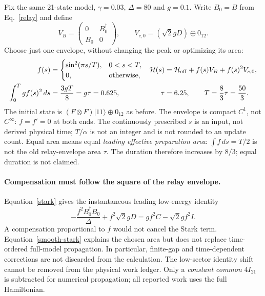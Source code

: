 \documentclass[11pt,a4paper]{article}
\newcommand{\ket}[1]{|#1\rangle}
\begin{document}
Fix the same 21-state model, $\gamma=0.03$, $\Delta=80$ and
$g=0.1$. Write $B_0=B$ from Eq.~\eqref{relay} and define
\begin{equation}
 V_B=\begin{pmatrix}0&B_0^\dagger\\B_0&0\end{pmatrix},\qquad
 V_{c,0}=(\sqrt2gD)\oplus0_{12}.
\end{equation}
Choose just one envelope, without changing the peak or optimizing its area:
\begin{align}
 f(s)&=\begin{cases}\sin^2(\pi s/T),&0<s<T,\\0,&\text{otherwise},\end{cases}
 &\mathcal H(s)&=\mathcal H_{\rm off}+f(s)V_B+f(s)^2V_{c,0},\label{smooth-H}\\
 \int_0^T gf(s)^2\,ds&=\frac{3gT}{8}=g\tau=0.625,
 &\tau&=6.25,\qquad T=\frac83\tau=\frac{50}{3}.\label{smooth-area}
\end{align}
The initial state is $(F\otimes F)\ket{11}\oplus0_{12}$ as before.
The envelope is compact $C^1$, not $C^\infty$: $f=f'=0$ at both ends.
The continuously prescribed $s$ is an input, not derived physical time;
$T/\alpha$ is not an integer and is not rounded to an update count.
Equal area means equal \emph{leading effective preparation area}:
$\int f\,ds=T/2$ is not the old relay-envelope area $\tau$.
The duration therefore increases by $8/3$; equal duration is not claimed.

\paragraph{Compensation must follow the square of the relay envelope.}
Equation~\eqref{stark} gives the instantaneous leading low-energy identity
\begin{equation}
 -\frac{f^2 B_0^\dagger B_0}{\Delta}+f^2\sqrt2gD
 =gf^2C-\sqrt2gf^2 I.\label{smooth-stark}
\end{equation}
A compensation proportional to $f$ would not cancel the Stark term.
Equation~\eqref{smooth-stark} explains the chosen area but does not replace
time-ordered full-model propagation. In particular, finite-gap and
time-dependent corrections are not discarded from the calculation.
The low-sector identity shift cannot be removed from the physical work
ledger. Only a \emph{constant common} $4I_{21}$ is subtracted for numerical
propagation; all reported work uses the full Hamiltonian.
\end{document}
